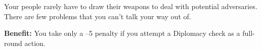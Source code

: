 
Your people rarely have to draw their weapons to deal with potential adversaries. There are few problems that you can’t talk your way out of.

\textbf{Benefit:} You take only a –5 penalty if you attempt a Diplomacy check as a full-round action.